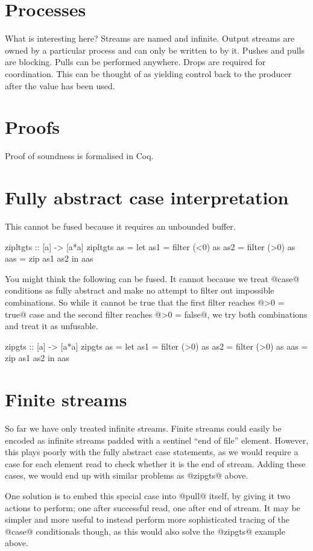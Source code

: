 
\section{Processes}
\label{s:ProcessZZZ}

What is interesting here?
Streams are named and infinite.
Output streams are owned by a particular process and can only be written to by it.
Pushes and pulls are blocking.
Pulls can be performed anywhere.
Drops are required for coordination.
This can be thought of as yielding control back to the producer after the value has been used.


\section{Proofs}
\label{s:Proofs}
Proof of soundness is formalised in Coq.

\section{Fully abstract case interpretation}

This cannot be fused because it requires an unbounded buffer.
\begin{code}
zipltgts :: [a] -> [a*a]
zipltgts as =
  let as1 = filter (<0) as
      as2 = filter (>0) as
      aas = zip as1 as2
  in  aas
\end{code}

You might think the following can be fused.
It cannot because we treat @case@ conditions as fully abstract and make no attempt to filter out impossible combinations.
So while it cannot be true that the first filter reaches @>0 = true@ case and the second filter reaches @>0 = false@, we try both combinations and treat it as unfusable.
\begin{code}
zipgts :: [a] -> [a*a]
zipgts as =
  let as1 = filter (>0) as
      as2 = filter (>0) as
      aas = zip as1 as2
  in  aas
\end{code}

\section{Finite streams}
So far we have only treated infinite streams.
Finite streams could easily be encoded as infinite streams padded with a sentinel ``end of file'' element.
However, this plays poorly with the fully abstract case statements, as we would require a case for each element read to check whether it is the end of stream.
Adding these cases, we would end up with similar problems as @zipgts@ above.

One solution is to embed this special case into @pull@ itself, by giving it two actions to perform; one after successful read, one after end of stream.
It may be simpler and more useful to instead perform more sophisticated tracing of the @case@ conditionals though, as this would also solve the @zipgts@ example above.


